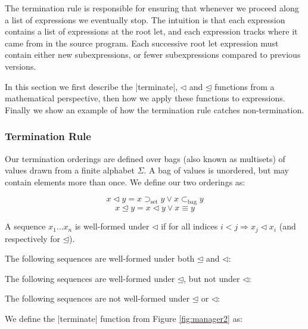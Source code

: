 \documentclass[draft]{sigplanconf}
\newcommand{\setsup}{\supset_{\mathrm{set}}}
\newcommand{\bagsub}{\subset_{\mathrm{bag}}}
\begin{document}
The termination rule is responsible for ensuring that whenever we proceed along a list of expressions we eventually stop. The intuition is that each expression contains a list of expressions at the root let, and each expression tracks where it came from in the source program. Each successive root let expression must contain either new subexpressions, or fewer subexpressions compared to previous versions.

In this section we first describe the |terminate|, $\lhd$ and $\unlhd$ functions from a mathematical perspective, then how we apply these functions to expressions. Finally we show an example of how the termination rule catches non-termination.

\subsubsection{Termination Rule}

Our termination orderings are defined over bags (also known as multisets) of values drawn from a finite alphabet $\Sigma$. A bag of values is unordered, but may contain elements more than once. We define our two orderings as:

\[
x \lhd y = x \setsup y \vee x \bagsub y
\]
\[
x \unlhd y = x \lhd y \vee x \equiv y
\]

A sequence $x_1 \ldots x_n$ is well-formed under $\lhd$ if for all indices $i < j \Rightarrow x_j \lhd x_i$ (and respectively for $\unlhd$).

The following sequences are well-formed under both $\unlhd$ and $\lhd$:

\begin{code}
\end{code}

The following sequences are well-formed under $\unlhd$, but not under $\lhd$:

\begin{code}
\end{code}

The following sequences are not well-formed under $\unlhd$ or $\lhd$:

\begin{code}
\end{code}

We define the |terminate| function from Figure \ref{fig:manager2} as:

\end{document}
